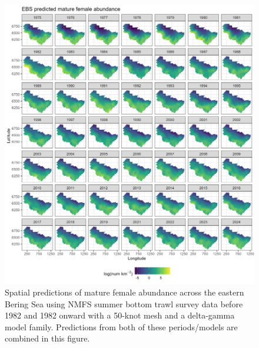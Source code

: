 \documentclass[
]{article}
\begin{document}
\begin{figure}

{\centering \includegraphics[width=1\linewidth,height=1\textheight]{../BAIRDI/Figures/EBS_matfem_spatabund} 

}

\caption{Spatial predictions of mature female abundance across the eastern Bering Sea using NMFS summer bottom trawl survey data before 1982 and 1982 onward with a 50-knot mesh and a delta-gamma model family. Predictions from both of these periods/models are combined in this figure.}\label{fig:spatpred-abund-50-matfem}
\end{figure}
\end{document}
